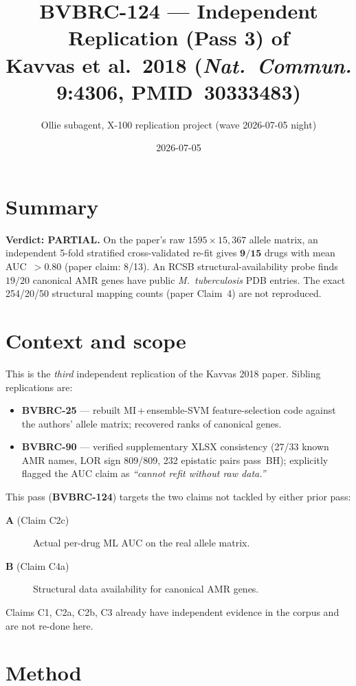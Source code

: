 \documentclass[11pt,letterpaper]{article}
\title{BVBRC-124 --- Independent Replication (Pass 3) of\\
Kavvas et al.\ 2018 (\emph{Nat.\ Commun.} 9:4306, PMID~30333483)}
\author{Ollie subagent, X-100 replication project (wave 2026-07-05 night)}
\date{2026-07-05}
\begin{document}
\maketitle

\section*{Summary}
\textbf{Verdict: PARTIAL.} On the paper's raw \(1595\times 15{,}367\) allele
matrix, an independent 5-fold stratified cross-validated re-fit gives
\(\mathbf{9/15}\) drugs with mean AUC~\(> 0.80\) (paper claim:
8/13). An RCSB structural-availability probe finds \(19/20\) canonical
AMR genes have public \emph{M.~tuberculosis} PDB entries. The exact
254/20/50 structural mapping counts (paper Claim~4) are not reproduced.

\section{Context and scope}
This is the \emph{third} independent replication of the Kavvas 2018 paper.
Sibling replications are:
\begin{itemize}
  \item \textbf{BVBRC-25} --- rebuilt MI\,+\,ensemble-SVM feature-selection code
        against the authors' allele matrix; recovered ranks of canonical genes.
  \item \textbf{BVBRC-90} --- verified supplementary XLSX consistency
        (27/33 known AMR names, LOR sign 809/809, 232 epistatic pairs pass~BH);
        explicitly flagged the AUC claim as \emph{``cannot refit without raw data.''}
\end{itemize}

This pass (\textbf{BVBRC-124}) targets the two claims not tackled by either
prior pass:
\begin{description}
  \item[\textbf{A} (Claim C2c)] Actual per-drug ML AUC on the real allele matrix.
  \item[\textbf{B} (Claim C4a)] Structural data availability for canonical AMR genes.
\end{description}
Claims C1, C2a, C2b, C3 already have independent evidence in the corpus and are
not re-done here.

\section{Method}
\end{document}
